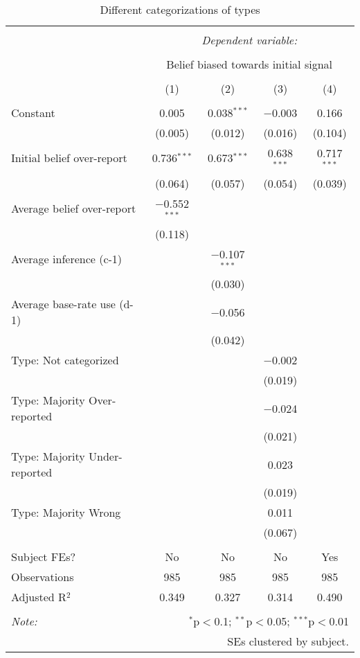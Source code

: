 
\begin{table}[!htbp] \centering 
  \caption{Different categorizations of types} 
  \label{tab:retractions_types} 
\begin{tabular}{@{\extracolsep{5pt}}lcccc} 
\\[-1.8ex]\hline 
\hline \\[-1.8ex] 
 & \multicolumn{4}{c}{\textit{Dependent variable:}} \\ 
\cline{2-5} 
\\[-1.8ex] & \multicolumn{4}{c}{Belief biased towards initial signal} \\ 
\\[-1.8ex] & (1) & (2) & (3) & (4)\\ 
\hline \\[-1.8ex] 
 Constant & 0.005 & 0.038$^{***}$ & $-$0.003 & 0.166 \\ 
  & (0.005) & (0.012) & (0.016) & (0.104) \\ 
  Initial belief over-report & 0.736$^{***}$ & 0.673$^{***}$ & 0.638$^{***}$ & 0.717$^{***}$ \\ 
  & (0.064) & (0.057) & (0.054) & (0.039) \\ 
  Average belief over-report & $-$0.552$^{***}$ &  &  &  \\ 
  & (0.118) &  &  &  \\ 
  Average inference (c-1) &  & $-$0.107$^{***}$ &  &  \\ 
  &  & (0.030) &  &  \\ 
  Average base-rate use (d-1) &  & $-$0.056 &  &  \\ 
  &  & (0.042) &  &  \\ 
  Type: Not categorized &  &  & $-$0.002 &  \\ 
  &  &  & (0.019) &  \\ 
  Type: Majority Over-reported &  &  & $-$0.024 &  \\ 
  &  &  & (0.021) &  \\ 
  Type: Majority Under-reported &  &  & 0.023 &  \\ 
  &  &  & (0.019) &  \\ 
  Type: Majority Wrong &  &  & 0.011 &  \\ 
  &  &  & (0.067) &  \\ 
 \hline \\[-1.8ex] 
Subject FEs? & No & No & No & Yes \\ 
Observations & 985 & 985 & 985 & 985 \\ 
Adjusted R$^{2}$ & 0.349 & 0.327 & 0.314 & 0.490 \\ 
\hline 
\hline \\[-1.8ex] 
\textit{Note:}  & \multicolumn{4}{r}{$^{*}$p$<$0.1; $^{**}$p$<$0.05; $^{***}$p$<$0.01} \\ 
 & \multicolumn{4}{r}{SEs clustered by subject.} \\ 
\end{tabular} 
\end{table} 
